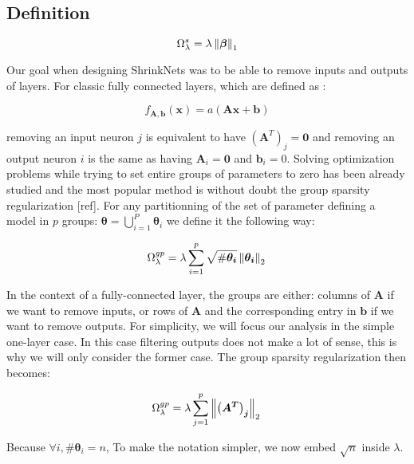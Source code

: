 \subsection{Definition}

\begin{equation}
  \Omega_\lambda^s = \lambda \left\lVert\bm{\beta}\right\rVert_1
\end{equation}

Our goal when designing ShrinkNets was to be able to remove inputs
and outputs of layers. For classic fully connected layers, which are defined
as :

\begin{equation} \label{fully_connected}
  f_{\bm{A}, \bm{b}}(\bm{x})=a(\bm{Ax + b})
\end{equation}

removing an input neuron $j$ is equivalent to have $\left(\bm{A}^T\right)_j = \bm{0}$
and removing an output neuron $i$ is the same as having $\bm{A}_i = \bm{0}$ and $\bm{b}_i = 0$. Solving  optimization problems while trying to set entire groups
of parameters to zero has been already studied and the most popular method
is without doubt the group sparsity regularization [ref]. For any partitionning of the set of parameter defining a model in $p$ groups: $\bm{\theta} = \bigcup_{i=1}^P \bm{\theta}_i$ we define it the following way:

\begin{equation}
  \Omega_\lambda^{gp} = \lambda \sum_{i=1}^p \sqrt{\#\bm{\theta_i}} \left\lVert\bm{\theta_i}\right\rVert_2 \\
\end{equation}

In the context of a fully-connected layer, the groups are either: columns of $\bm{A}$ if we want to remove inputs, or rows of $\bm{A}$ and the corresponding entry in $\bm{b}$ if we want to remove outputs. For simplicity, we will focus our analysis in the simple one-layer case. In this case filtering outputs does not make a lot of sense, this is why we will only consider the former case. The group sparsity regularization then becomes:


\begin{equation} \label{group_sparsity_regularization}
  \Omega_\lambda^{gp} = \lambda \sum_{j=1}^p \left\lVert\bm{\left(A^T\right)_j}\right\rVert_2 \\
\end{equation}

Because $\forall i, \#\bm{\theta}_i = n$, To make the notation simpler,
we now embed $\sqrt{n}$ inside $\lambda$.

